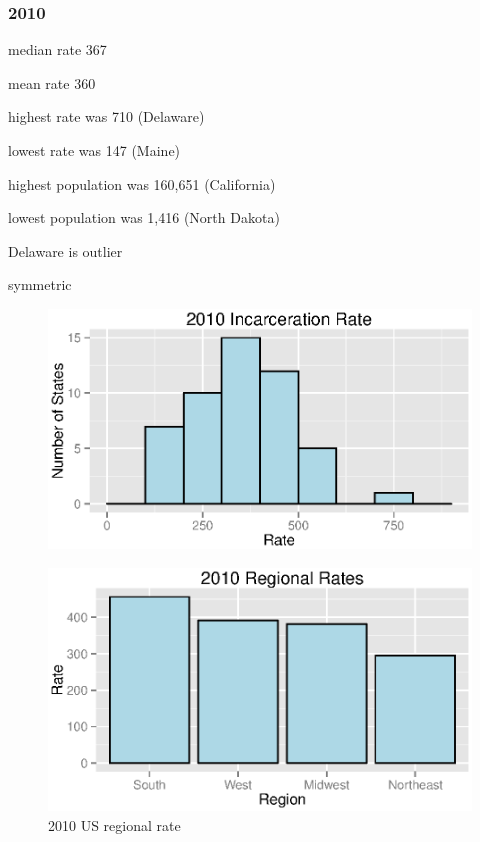 \documentclass{exam}
\begin{document}
  \subsubsection{2010}
  \begin{itemize*}
    \item median rate 367
    \item mean rate 360
    \item highest rate was 710 (Delaware)
    \item lowest rate was 147 (Maine)
    \item highest population was 160,651 (California)
    \item lowest population was 1,416 (North Dakota)
    \item Delaware is outlier
    \item symmetric
  \end{itemize*}

  \begin{figure}[H]
    \centering
    \includegraphics[scale = 0.9]{figures/rate_histogram_2010.eps}
  \end{figure}

  \begin{figure}[H]
    \centering
    \includegraphics[scale = 0.9]{figures/regional_rates_2010.eps}
    \caption{2010 US regional rate}
  \end{figure}
\end{document}
